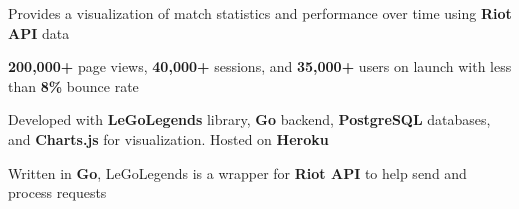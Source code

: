 \documentclass[]{peter_resume}
\begin{document}
\begin{minipage}{\textwidth}
\begin{tightemize}
\item Provides a visualization of match statistics and performance over time using \textbf{Riot API} data
\item \textbf{200,000+} page views, \textbf{40,000+} sessions, and \textbf{35,000+} users on launch with less than \textbf{8\%} bounce rate
\item Developed with \textbf{LeGoLegends} library, \textbf{Go} backend, \textbf{PostgreSQL} databases, and \textbf{Charts.js} for visualization. Hosted on \textbf{Heroku}
\end{tightemize} 
\sectionsep

\location{}
\begin{tightemize}
\item Written in \textbf{Go}, LeGoLegends is a wrapper for \textbf{Riot API} to help send and process requests
\end{tightemize} 
\sectionsep

\begin{comment}
\runsubsection{Bipolar Animals}
\location{\urlstyle{same}\url{http://ba.peterli.io} \hfill Url alias generator}
\begin{tightemize}
\item A Rails web application that generates easy to remember aliases for URLs
\item Developed with \textbf{Ruby on Rails}, \textbf{PostgreSQL} databases, and hosted on \textbf{Heroku}
\end{tightemize}
\sectionsep

\runsubsection{PC Pwns Console (PCPC)}
\location{\hfill Custom Java Framework}
\begin{tightemize}
\item Designed to be for faster and easier development for games and GUI applications
\item Provides tools for accessible file I/O, text I/O, audio, graphics, and socket connections
\end{tightemize}
\sectionsep

\runsubsection{BubblEscape}
\location{\hfill Original Android game}
\begin{tightemize}
\item \textbf{Led}, \textbf{architected}, and \textbf{managed} the project over the entire development cycle
\item Assigned tasks to other developers and organized meetings and set deadlines
\item Implemented object collisions, animations, character AI, game logic, and unique swipe controls
\item \textbf{300+} installs on Google Play store
\end{tightemize} 
\sectionsep


\end{comment}
\end{minipage}
\end{document}
